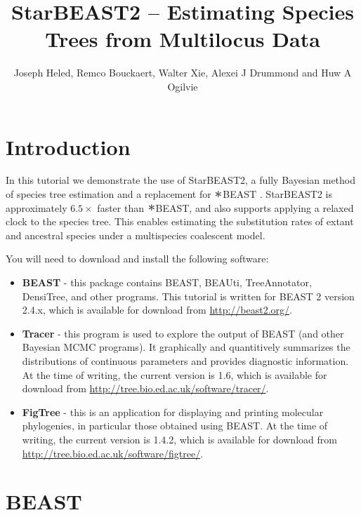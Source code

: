 \documentclass{article}
\newcommand{\BEASTVersion}{2.4.x}
\newcommand{\TracerVersion}{1.6}
\newcommand{\FigTreeVersion}{1.4.2}
\newcommand{\Conv}{\mathop{\scalebox{1.5}{$\ast$}}}
\begin{document}
\title{StarBEAST2 -- Estimating Species Trees from Multilocus Data}

\author{Joseph Heled, Remco Bouckaert, Walter Xie, Alexei J Drummond and Huw A Ogilvie}

\maketitle

\section{Introduction}

In this tutorial we demonstrate the use of StarBEAST2, a fully Bayesian method
of species tree estimation and a replacement for $\Conv$BEAST
\citep{Heled01032010}. StarBEAST2 is approximately $6.5\times$ faster than $\Conv$BEAST,
and also supports applying a relaxed clock to the species tree. This enables
estimating the substitution rates of extant and ancestral species under a
multispecies coalescent model.

You will need to download and install the following software:

\begin{itemize}
\item \textbf{BEAST} - this package contains BEAST, BEAUti,
TreeAnnotator, DensiTree, and other programs. This tutorial is written
for BEAST 2 \citep{10.1371/journal.pcbi.1003537} version {\BEASTVersion}, which is available for download from
\url{http://beast2.org/}.
\item \textbf{Tracer} - this program is used to explore the output of BEAST (and
other Bayesian MCMC programs). It graphically and quantitively summarizes the
distributions of continuous parameters and provides diagnostic information. At
the time of writing, the current version is {\TracerVersion}, which is available
for download from \url{http://tree.bio.ed.ac.uk/software/tracer/}.
\item \textbf{FigTree} - this is an application for displaying and printing
molecular phylogenies, in particular those obtained using BEAST. At the time of
writing, the current version is {\FigTreeVersion}, which is available for download
from \url{http://tree.bio.ed.ac.uk/software/figtree/}.
\end{itemize}

\section{BEAST}
\end{document}
